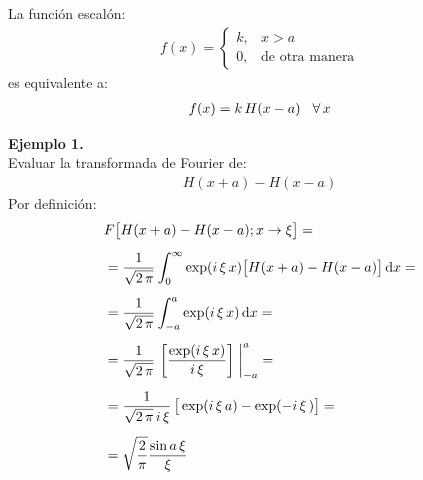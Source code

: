 La función escalón:
\begin{align*}
f(x) = \begin{cases}
k, & x > a \\[0.5em]
0, & \mbox{de otra manera}
\end{cases}
\end{align*}
es equivalente a:
\begin{align*}
f(x) = k \, H(x - a) \hspace{0.3cm} \forall \, x
\end{align*}
\bigskip

\noindent
\textbf{Ejemplo 1.}
\\
Evaluar la transformada de Fourier de:
\begin{align*}
H(x + a) - H(x - a)
\end{align*}
Por definición:
\begin{align*}
&F \big[H(x + a) - H(x - a); x \to \xi\big] = \\[0.5em]
&= \dfrac{1}{\sqrt{2\, \pi}} \int_{0}^{\infty} \exp(i \, \xi \, x) \big[H(x + a) - H(x - a)\big] \dd{x} = \\[0.5em]
&= \dfrac{1}{\sqrt{2\, \pi}} \int_{-a}^{a} \exp(i \, \xi \, x) \dd{x} = \\[0.5em]
&= \dfrac{1}{\sqrt{2\, \pi}} \, \left[ \dfrac{\exp(i \, \xi \, x)}{i \, \xi} \right] \eval_{-a}^{a} = \\[0.5em]
&= \dfrac{1}{\sqrt{2\, \pi} \, i \, \xi} \, \big[\exp(i \, \xi \, a) - \exp(-i \, \xi \, ) \big] = \\[0.5em]
&= \sqrt{\dfrac{2}{\pi}} \dfrac{\sin a \, \xi}{\xi}
\end{align*}

